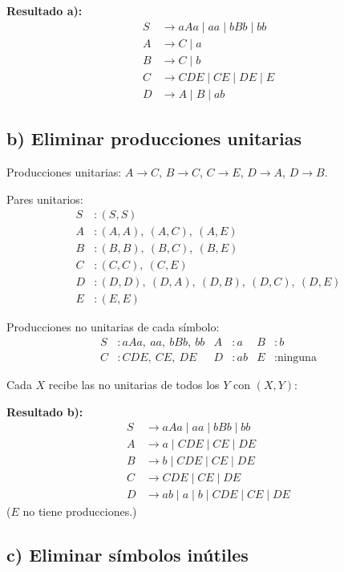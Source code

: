 \documentclass[11pt]{article}
\begin{document}
\textbf{Resultado a):}
\begin{align*}
S &\to aAa \mid aa \mid bBb \mid bb\\
A &\to C \mid a\\
B &\to C \mid b\\
C &\to CDE \mid CE \mid DE \mid E\\
D &\to A \mid B \mid ab
\end{align*}

\subsection*{b) Eliminar producciones unitarias}

Producciones unitarias: $A \to C$, $B \to C$, $C \to E$, $D \to A$, $D \to B$.

Pares unitarios:
\begin{align*}
S &: (S,S)\\
A &: (A,A),\ (A,C),\ (A,E)\\
B &: (B,B),\ (B,C),\ (B,E)\\
C &: (C,C),\ (C,E)\\
D &: (D,D),\ (D,A),\ (D,B),\ (D,C),\ (D,E)\\
E &: (E,E)
\end{align*}

Producciones no unitarias de cada s\'imbolo:
\begin{align*}
S &: aAa,\ aa,\ bBb,\ bb & A &: a & B &: b\\
C &: CDE,\ CE,\ DE & D &: ab & E &: \text{ninguna}
\end{align*}

Cada $X$ recibe las no unitarias de todos los $Y$ con $(X,Y)$:

\textbf{Resultado b):}
\begin{align*}
S &\to aAa \mid aa \mid bBb \mid bb\\
A &\to a \mid CDE \mid CE \mid DE\\
B &\to b \mid CDE \mid CE \mid DE\\
C &\to CDE \mid CE \mid DE\\
D &\to ab \mid a \mid b \mid CDE \mid CE \mid DE
\end{align*}
($E$ no tiene producciones.)

\subsection*{c) Eliminar s\'imbolos in\'utiles}
\end{document}
